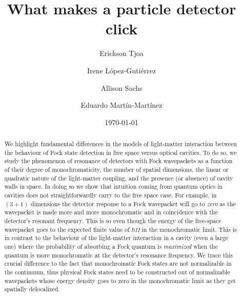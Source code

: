 \documentclass[11pt,prd,onecolumn,superscriptaddress,nofootinbib,floatfix,amsmath,amssymb]{revtex4-2}
\begin{document}




\title{What makes a particle detector click}

\author{Erickson Tjoa}

\author{Irene L\'opez-Guti\'errez}
%    
\author{Allison Sachs}

\author{Eduardo Mart\'in-Mart\'inez}

\date{\today}

\begin{abstract}
   
    We highlight fundamental differences in the models of  light-matter interaction between the behaviour of Fock state detection in free space versus optical cavities. To do so, we study the phenomenon of resonance of detectors with Fock wavepackets as a function of their degree of monochromaticity, the number of spatial dimensions, the linear or quadratic nature of the light-matter coupling, and the presence (or absence) of cavity walls in space. In doing so we show that intuition coming from quantum optics in cavities does not straightforwardly carry to the free space case. For example, in $(3+1)$ dimensions the detector response to a Fock wavepacket will go to \textit{zero} as the wavepacket is made more and more monochromatic and in coincidence with the detector's resonant frequency. This is so even though the energy of the free-space wavepacket goes to the expected finite value of $\hbar\Omega$ in the monochromatic limit. This is in contrast to the behaviour of the light-matter interaction in a cavity (even a large one) where the probability of absorbing a Fock quantum is \textit{maximized} when the quantum is more monochromatic at the detector's resonance frequency.  We trace this crucial difference to the fact that monochromatic Fock states are not normalizable in the continuum, thus physical Fock states need to be constructed out of normalizable wavepackets whose energy density goes to zero in the monochromatic limit as they get spatially delocalized.
    
    
\end{abstract}
\end{document}
